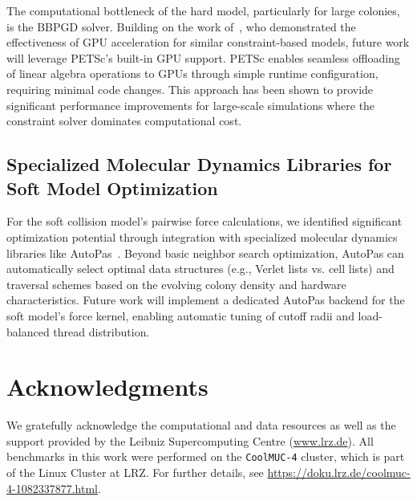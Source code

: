 \documentclass[conference]{IEEEtran}
\begin{document}
The computational bottleneck of the hard model, particularly for large colonies, is the BBPGD solver. Building on the work of~\cite{Tasora2008}, who demonstrated the effectiveness of GPU acceleration for similar constraint-based models, future work will leverage PETSc's built-in GPU support. PETSc enables seamless offloading of linear algebra operations to GPUs through simple runtime configuration, requiring minimal code changes. This approach has been shown to provide significant performance improvements for large-scale simulations where the constraint solver dominates computational cost.

\subsection{Specialized Molecular Dynamics Libraries for Soft Model Optimization}

For the soft collision model's pairwise force calculations, we identified significant optimization potential through integration with specialized molecular dynamics libraries like AutoPas~\cite{Gratl2019,Newcome2023}. Beyond basic neighbor search optimization, AutoPas can automatically select optimal data structures (e.g., Verlet lists vs. cell lists) and traversal schemes based on the evolving colony density and hardware characteristics. Future work will implement a dedicated AutoPas backend for the soft model's force kernel, enabling automatic tuning of cutoff radii and load-balanced thread distribution.

\section*{Acknowledgments}

We gratefully acknowledge the computational and data resources as well as the support provided by the Leibniz Supercomputing Centre (\url{www.lrz.de}). All benchmarks in this work were performed on the \texttt{CoolMUC-4} cluster, which is part of the Linux Cluster at LRZ. For further details, see \url{https://doku.lrz.de/coolmuc-4-1082337877.html}.


\newpage

\balance


\newpage
\nobalance


\onecolumn

\appendix
\renewcommand{\thefigure}{A\arabic{figure}}
\renewcommand{\thetable}{A.\arabic{table}}
\setcounter{figure}{0}
\setcounter{table}{0}
\end{document}
